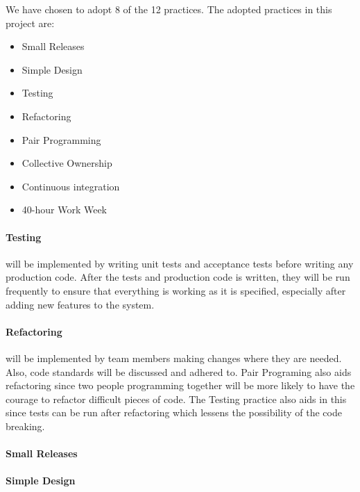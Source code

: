 We have chosen to adopt 8 of the 12 practices. 
The adopted practices in this project are:
\begin{itemize}
\item Small Releases
\item Simple Design
\item Testing
\item Refactoring
\item Pair Programming
\item Collective Ownership
\item Continuous integration
\item 40-hour Work Week
\end{itemize}

\paragraph{Testing} will be implemented by writing unit tests and acceptance tests before writing any production code. After the tests and production code is written, they will be run frequently to ensure that everything is working as it is specified, especially after adding new features to the system.

\paragraph{Refactoring} will be implemented by team members making changes where they are needed. Also, code standards will be discussed and adhered to. Pair Programing also aids refactoring since two people programming together will be more likely to have the courage to refactor difficult pieces of code. The Testing practice also aids in this since tests can be run after refactoring which lessens the possibility of the code breaking.

\paragraph{Small Releases} %

\paragraph{Simple Design}%

